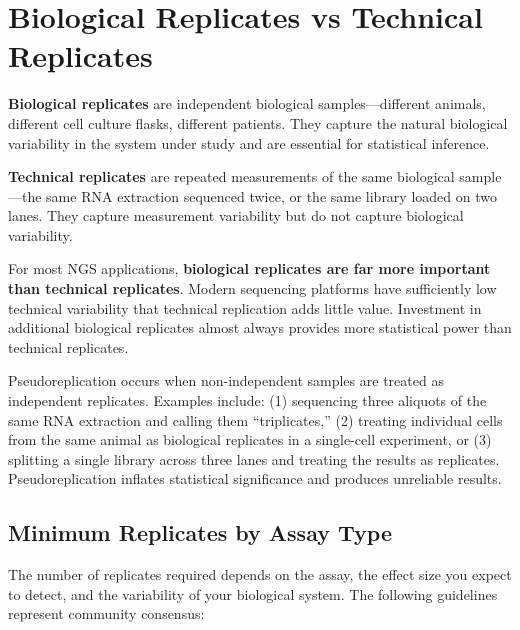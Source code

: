 \section{Biological Replicates vs Technical Replicates}
\label{sec:expdesign:replicates}

\begin{keyconcept}[title={Replicates}]
\textbf{Biological replicates} are independent biological samples---different animals, different cell culture flasks, different patients. They capture the natural biological variability in the system under study and are essential for statistical inference.

\textbf{Technical replicates} are repeated measurements of the same biological sample---the same RNA extraction sequenced twice, or the same library loaded on two lanes. They capture measurement variability but do not capture biological variability.
\end{keyconcept}

For most NGS applications, \textbf{biological replicates are far more important than technical replicates}. Modern sequencing platforms have sufficiently low technical variability that technical replication adds little value. Investment in additional biological replicates almost always provides more statistical power than technical replicates.

\begin{warningbox}[title={Common Mistake: Pseudoreplication}]
Pseudoreplication occurs when non-independent samples are treated as independent replicates. Examples include: (1) sequencing three aliquots of the same RNA extraction and calling them ``triplicates,'' (2) treating individual cells from the same animal as biological replicates in a single-cell experiment, or (3) splitting a single library across three lanes and treating the results as replicates. Pseudoreplication inflates statistical significance and produces unreliable results.
\end{warningbox}

\subsection{Minimum Replicates by Assay Type}

The number of replicates required depends on the assay, the effect size you expect to detect, and the variability of your biological system. The following guidelines represent community consensus:

